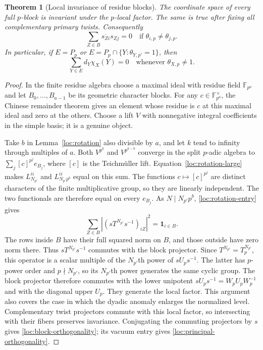 \documentclass[11pt,a4paper]{article}
\numberwithin{equation}{section}
\newtheorem{theorem}{Theorem}[section]
\begin{document}
\begin{theorem}[Local invariance of residue blocks]\label{loc:block}
The coordinate space of every full $p$-block is invariant under the
$p$-local factor. The same is true after fixing all complementary
primary twists. Consequently
\begin{equation}\label{loc:block-orthogonality}
 \sum_{Z\in B}\overline{s_{Zi}}s_{Zj}=0
           \quad\text{if }\theta_{i,p}\ne\theta_{j,p}.
\end{equation}
In particular, if $E=P_p$ or
$E=P_p\cap\{Y:\theta_{Y,p'}=1\}$, then
\begin{equation}\label{loc:principal-orthogonality}
 \sum_{Y\in E}d_Y\chi_X(Y)=0
                 \quad\text{whenever }\theta_{X,p}\ne1.
\end{equation}
\end{theorem}
\begin{proof}
In the finite residue algebra choose a maximal ideal with residue
field $\mathbb F_{p^a}$ and let $B_0,\ldots,B_{a-1}$ be its geometric
character blocks. For any $c\in\mathbb F_{p^a}^{\times}$, the
Chinese remainder theorem gives an element whose residue is $c$ at
this maximal ideal and zero at the others. Choose a lift $V$ with
nonnegative integral coefficients in the simple basis; it is a genuine
object.

Take $b$ in Lemma~\ref{loc:rotation} also divisible by $a$, and let
$k$ tend to infinity through multiples of $a$. Both $V^{p^k}$ and
$V^{p^{k-b}}$ converge in the split $p$-adic algebra to
$\sum_j[c]^{p^j}e_{B_j}$, where $[c]$ is the Teichm\"uller lift.
Equation~\eqref{loc:rotation-large} makes
$L_{N_{p'}}^{ii}$ and $L_{N_{p'}p^b}^{ii}$ equal on this sum.
The functions $c\mapsto[c]^{p^j}$ are distinct characters of the
finite multiplicative group, so they are linearly independent. The
two functionals are therefore equal on every $e_{B_j}$. As
$N\mid N_{p'}p^b$, \eqref{loc:rotation-entry} gives
\[
 \sum_{Z\in B}|(sT^{N_{p'}}s^{-1})_{iZ}|^2
                    =\mathbf1_{i\in B}.
\]
The rows inside $B$ have their full squared norm on $B$, and those
outside have zero norm there. Thus $sT^{N_{p'}}s^{-1}$ commutes with
the block projector. Since $T^{N_{p'}}=T_p^{N_{p'}}$,
this operator is a scalar multiple of the $N_{p'}$th power of
$sU_ps^{-1}$. The latter has $p$-power order and $p\nmid N_{p'}$,
so its $N_{p'}$th power generates the same cyclic group.
The block projector therefore commutes with the lower unipotent
$sU_ps^{-1}=W_pU_pW_p^{-1}$ and with the diagonal upper $U_p$.
They generate the local factor. This argument also covers the case in
which the dyadic anomaly enlarges the normalized level.
Complementary twist projectors commute with this local factor, so
intersecting with their fibers preserves invariance. Conjugating the
commuting projectors by $s$ gives \eqref{loc:block-orthogonality}; its
vacuum entry gives \eqref{loc:principal-orthogonality}.
\end{proof}
\end{document}

